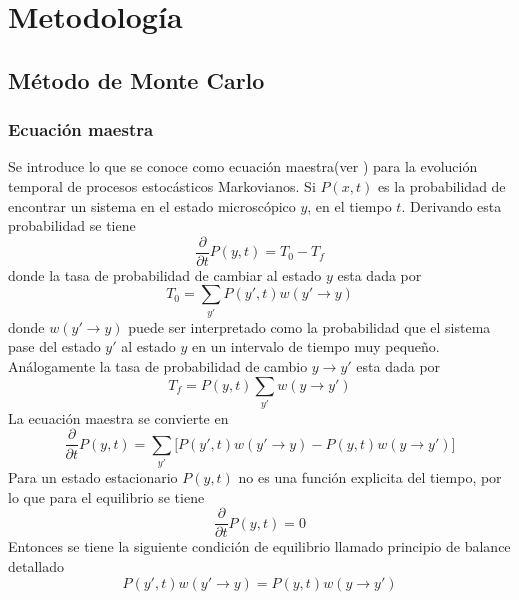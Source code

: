 \documentclass[a4paper]{article}
\begin{document}
\section{Metodología}
\subsection{Método de Monte Carlo}
\subsubsection{Ecuación maestra}
Se introduce lo que se conoce como ecuación maestra(ver \cite{silvio}) para la evolución temporal de procesos estocásticos Markovianos. Si $P(x,t)$ es la probabilidad de encontrar un sistema en el estado microscópico $y$, en el tiempo $t$. Derivando esta probabilidad se tiene
\begin{equation}
\frac{\partial}{\partial t}P(y,t)=T_0-T_f
\end{equation}
donde la tasa de probabilidad de cambiar al estado $y$ esta dada por
\begin{equation}
T_0=\sum_{y'}P(y',t)w(y'\rightarrow y)
\end{equation}
donde $w(y'\rightarrow y)$ puede ser interpretado como la probabilidad que el sistema pase del estado $y'$ al estado $y$ en un intervalo de tiempo muy pequeño. Análogamente la tasa de probabilidad de cambio $y\rightarrow y'$ esta dada por
\begin{equation}
T_f=P(y,t)\sum_{y'}w(y\rightarrow y')
\end{equation}
La ecuación maestra se convierte en 
\begin{equation}\label{masterEq}
\frac{\partial}{\partial t}P(y,t)=\sum_{y'}\Big[P(y',t)w(y'\rightarrow y)-P(y,t)w(y\rightarrow y')\Big]
\end{equation}
Para un estado estacionario $P(y,t)$ no es una función explicita del tiempo, por lo que para el equilibrio se tiene
\begin{equation}
\frac{\partial}{\partial t}P(y,t)=0
\end{equation}
Entonces se tiene la siguiente condición de equilibrio llamado principio de balance detallado
\begin{equation}\label{equi}
P(y',t)w(y'\rightarrow y)=P(y,t)w(y\rightarrow y')
\end{equation}
\end{document}
